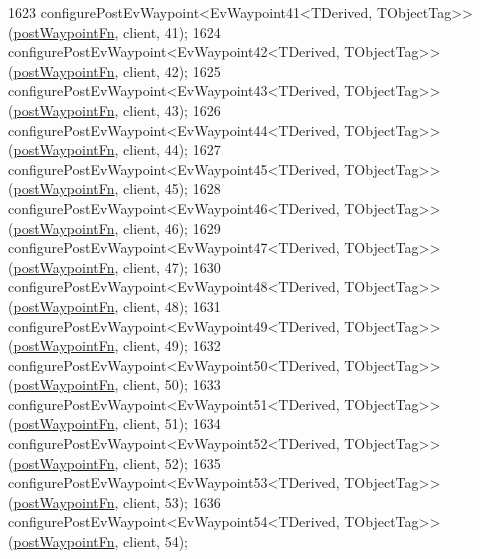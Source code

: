 \begin{DoxyCode}
1623     configurePostEvWaypoint<EvWaypoint41<TDerived, TObjectTag>>(\hyperlink{classcl__move__base__z_1_1WaypointEventDispatcher_a964a57fcce5d48ec60243230722d8dd7}{postWaypointFn}, client, 41);
1624     configurePostEvWaypoint<EvWaypoint42<TDerived, TObjectTag>>(\hyperlink{classcl__move__base__z_1_1WaypointEventDispatcher_a964a57fcce5d48ec60243230722d8dd7}{postWaypointFn}, client, 42);
1625     configurePostEvWaypoint<EvWaypoint43<TDerived, TObjectTag>>(\hyperlink{classcl__move__base__z_1_1WaypointEventDispatcher_a964a57fcce5d48ec60243230722d8dd7}{postWaypointFn}, client, 43);
1626     configurePostEvWaypoint<EvWaypoint44<TDerived, TObjectTag>>(\hyperlink{classcl__move__base__z_1_1WaypointEventDispatcher_a964a57fcce5d48ec60243230722d8dd7}{postWaypointFn}, client, 44);
1627     configurePostEvWaypoint<EvWaypoint45<TDerived, TObjectTag>>(\hyperlink{classcl__move__base__z_1_1WaypointEventDispatcher_a964a57fcce5d48ec60243230722d8dd7}{postWaypointFn}, client, 45);
1628     configurePostEvWaypoint<EvWaypoint46<TDerived, TObjectTag>>(\hyperlink{classcl__move__base__z_1_1WaypointEventDispatcher_a964a57fcce5d48ec60243230722d8dd7}{postWaypointFn}, client, 46);
1629     configurePostEvWaypoint<EvWaypoint47<TDerived, TObjectTag>>(\hyperlink{classcl__move__base__z_1_1WaypointEventDispatcher_a964a57fcce5d48ec60243230722d8dd7}{postWaypointFn}, client, 47);
1630     configurePostEvWaypoint<EvWaypoint48<TDerived, TObjectTag>>(\hyperlink{classcl__move__base__z_1_1WaypointEventDispatcher_a964a57fcce5d48ec60243230722d8dd7}{postWaypointFn}, client, 48);
1631     configurePostEvWaypoint<EvWaypoint49<TDerived, TObjectTag>>(\hyperlink{classcl__move__base__z_1_1WaypointEventDispatcher_a964a57fcce5d48ec60243230722d8dd7}{postWaypointFn}, client, 49);
1632     configurePostEvWaypoint<EvWaypoint50<TDerived, TObjectTag>>(\hyperlink{classcl__move__base__z_1_1WaypointEventDispatcher_a964a57fcce5d48ec60243230722d8dd7}{postWaypointFn}, client, 50);
1633     configurePostEvWaypoint<EvWaypoint51<TDerived, TObjectTag>>(\hyperlink{classcl__move__base__z_1_1WaypointEventDispatcher_a964a57fcce5d48ec60243230722d8dd7}{postWaypointFn}, client, 51);
1634     configurePostEvWaypoint<EvWaypoint52<TDerived, TObjectTag>>(\hyperlink{classcl__move__base__z_1_1WaypointEventDispatcher_a964a57fcce5d48ec60243230722d8dd7}{postWaypointFn}, client, 52);
1635     configurePostEvWaypoint<EvWaypoint53<TDerived, TObjectTag>>(\hyperlink{classcl__move__base__z_1_1WaypointEventDispatcher_a964a57fcce5d48ec60243230722d8dd7}{postWaypointFn}, client, 53);
1636     configurePostEvWaypoint<EvWaypoint54<TDerived, TObjectTag>>(\hyperlink{classcl__move__base__z_1_1WaypointEventDispatcher_a964a57fcce5d48ec60243230722d8dd7}{postWaypointFn}, client, 54);

\end{DoxyCode}
